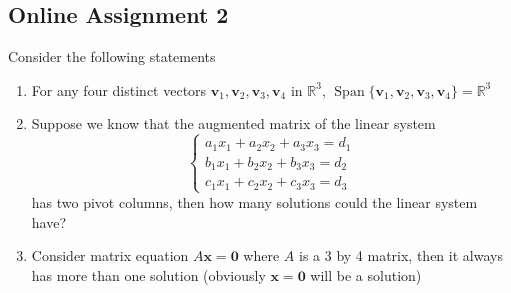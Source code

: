 \documentclass[a4paper,10pt]{article}
\begin{document}
\subsection{Online Assignment 2}

\begin{problem}
Consider the following statements
\begin{enumerate}
\item For any four distinct vectors $\mathbf v_1,\mathbf v_2,\mathbf v_3,\mathbf v_4$ in $\mathbb R^3$, $\operatorname{Span}\{\mathbf v_1,\mathbf v_2,\mathbf v_3,\mathbf v_4\}=\mathbb R^3$
\item Suppose we know that the augmented matrix of the linear system
\[
\begin{cases}
a_1x_1+a_2x_2+a_3x_3=d_1\\
b_1x_1+b_2x_2+b_3x_3=d_2\\
c_1x_1+c_2x_2+c_3x_3=d_3
\end{cases}
\]
has two pivot columns, then how many solutions could the linear system have?
\item Consider matrix equation $A\mathbf x=\mathbf 0$ where $A$ is a 3 by 4 matrix, then it always has more than one solution (obviously $\mathbf x=\mathbf0$ will be a solution)
\end{enumerate}
\end{problem}
\end{document}
